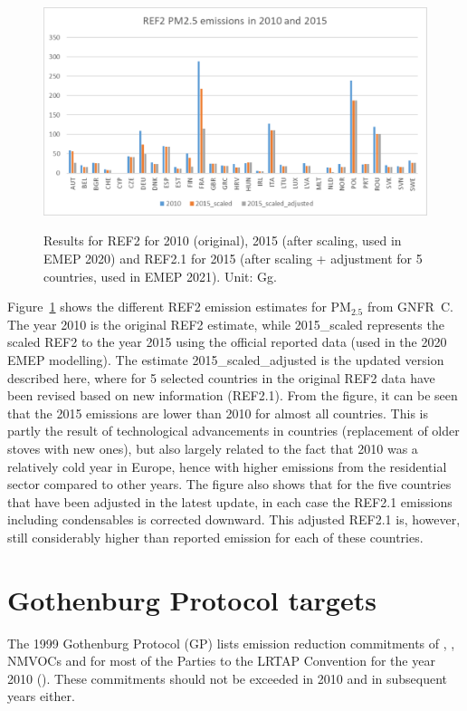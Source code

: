 \begin{figure}[h]
\centering
{\includegraphics*[viewport=1 1 740 400,clip,scale=0.45]{FIGS_CEIP/Fig3.pdf}}
\caption{Results for REF2 for 2010 (original), 2015 (after scaling, used in EMEP 2020) and REF2.1 for 2015 (after scaling + adjustment for 5 countries, used in EMEP 2021). Unit: Gg.}
\label{fig:CEIP3}
\end{figure}


Figure~\ref{fig:CEIP3} shows the different REF2 emission estimates for PM$_{2.5}$ from GNFR~C. The year 2010 is the original REF2 estimate, while 2015\_scaled represents the scaled REF2 to the year 2015 using the official reported data (used in the 2020 EMEP modelling). The estimate 2015\_scaled\_adjusted is the updated version described here, where for 5 selected countries in the original REF2 data have been revised based on new information (REF2.1).
From the figure, it can be seen that the 2015 emissions are lower than 2010 for almost all countries. This is partly the result of technological advancements in countries (replacement of older stoves with new ones), but also largely related to the fact that 2010 was a relatively cold year in Europe, hence with higher emissions from the residential sector compared to other years. The figure also shows that for the five countries that have been adjusted in the latest update, in each case the REF2.1 emissions including condensables is corrected downward. This adjusted REF2.1 is, however, still considerably higher than reported emission for each of these countries.

\section{Gothenburg Protocol targets}
\label{sec:GP}

The 1999 Gothenburg Protocol (GP) lists emission reduction commitments of  \nox,
\sox, NMVOCs and \nhiii for most of the Parties to the LRTAP Convention for the year 2010 (\cite{UNECE1999}). These commitments should not be exceeded in 2010 and in subsequent years either.

